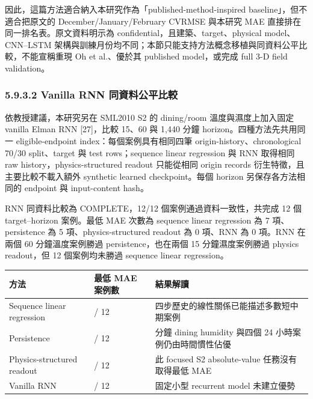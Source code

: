 \documentclass[12pt,a4paper]{article}
\begin{document}
因此，這篇方法適合納入本研究作為「published-method-inspired baseline」，但不適合把原文的 December/January/February CVRMSE 與本研究 MAE 直接排在同一排名表。原文資料明示為 confidential，且建築、target、physical model、CNN--LSTM 架構與訓練月份均不同；本節只能支持方法概念移植與同資料公平比較，不能宣稱重現 Oh et al.、優於其 published model，或完成 full 3-D field validation。


\subsubsection*{5.9.3.2 Vanilla RNN 同資料公平比較}

依教授建議，本研究另在 SML2010 S2 的 dining/room 溫度與濕度上加入固定 vanilla Elman RNN [27]，比較 15、60 與 1,440 分鐘 horizon。四種方法先共用同一 eligible-endpoint index：每個案例具有相同四筆 origin-history、chronological 70/30 split、target 與 test rows；sequence linear regression 與 RNN 取得相同 raw history，physics-structured readout 只能從相同 origin records 衍生特徵，且主要比較不載入額外 synthetic learned checkpoint。每個 horizon 另保存各方法相同的 endpoint 與 input-content hash。


RNN 同資料比較為 COMPLETE，12/12 個案例通過資料一致性，共完成 12 個 target--horizon 案例。最低 MAE 次數為 sequence linear regression 為 7 項、persistence 為 5 項、physics-structured readout 為 0 項、RNN 為 0 項。RNN 在兩個 60 分鐘溫度案例勝過 persistence，也在兩個 15 分鐘濕度案例勝過 physics readout，但 12 個案例均未勝過 sequence linear regression。


\begin{table}[htbp]
\centering
\footnotesize
\renewcommand{\arraystretch}{1.25}
\begin{tabular}{|>{\raggedright\arraybackslash}p{}|>{\raggedright\arraybackslash}p{}|>{\raggedright\arraybackslash}p{}|}
\hline
\textbf{方法} & \textbf{最低 MAE 案例數} & \textbf{結果解讀} \\
\hline
Sequence linear regression & 7 / 12 & 四步歷史的線性關係已能描述多數短中期案例 \\
\hline
Persistence & 5 / 12 & 60 分鐘 dining humidity 與四個 24 小時案例仍由時間慣性佔優 \\
\hline
Physics-structured readout & 0 / 12 & 此 focused S2 absolute-value 任務沒有取得最低 MAE \\
\hline
Vanilla RNN & 0 / 12 & 固定小型 recurrent model 未建立優勢 \\
\hline
\end{tabular}
\end{table}
\end{document}
